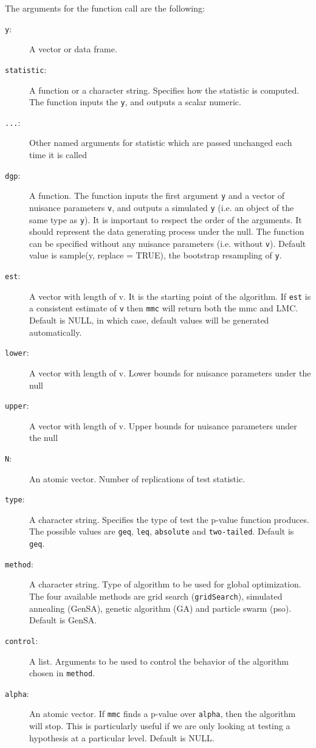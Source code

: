 \documentclass[11pt]{article}\usepackage[]{graphicx}\usepackage[]{color}
\newcommand{\pkg}[1]{{\normalfont\fontseries{b}\selectfont #1}}
\let\code=\texttt
\begin{document}
The arguments for the function call are the following:
\begin{description}
		\item[\code{y}:] A vector or data frame.

		\item[\code{statistic}:] A function or a character string. Specifies how the statistic is computed.
		The function inputs the \code{y}, and outputs a scalar numeric.

		\item[\code{...}:] Other named arguments for statistic which are passed unchanged each time it is
		called

		\item[\code{dgp}:] A function. The function inputs the first argument \code{y} and a vector of
		nuisance parameters \code{v}, and outputs a simulated \code{y} (i.e. an object of the same
		type as \code{y}). It is important to respect the order of the arguments. It should represent the data generating process under the null. The function can be specified without any nuisance parameters (i.e. without \code{v}). Default value is sample(y, replace = TRUE), the bootstrap
		resampling of \code{y}.

		\item[\code{est}:] A vector with length of v. It is the starting point of the algorithm. If \code{est} is a consistent estimate of \code{v} then \code{mmc} will return both the mmc and LMC. Default is NULL, in which case, default values will be generated automatically.

		\item[\code{lower}:] A vector with length of v. Lower bounds for nuisance parameters under the null

		\item[\code{upper}:] A vector with length of v. Upper bounds for nuisance parameters under the null

		\item[\code{N}:] An atomic vector. Number of replications of test statistic.

		\item[\code{type}:] A character string. Specifies the type of test the p-value function
		produces. The possible values are \code{geq}, \code{leq}, \code{absolute} and
		\code{two-tailed}. Default is \code{geq}.

		\item[\code{method}:] A character string. Type of algorithm to be used for global optimization.
		The four available methods are grid search (\code{gridSearch}), simulated annealing (\pkg{GenSA}), genetic algorithm (\pkg{GA}) and particle swarm (\pkg{pso}).
		Default is \pkg{GenSA}.

		\item[\code{control}:] A list. Arguments to be used to control the behavior of the algorithm chosen in \code{method}.

		\item[\code{alpha}:] An atomic vector. If \code{mmc} finds a p-value over \code{alpha}, then the algorithm will stop. This is particularly useful if we are only looking at testing a hypothesis at a particular level. Default is NULL.
\end{description}
\end{document}
